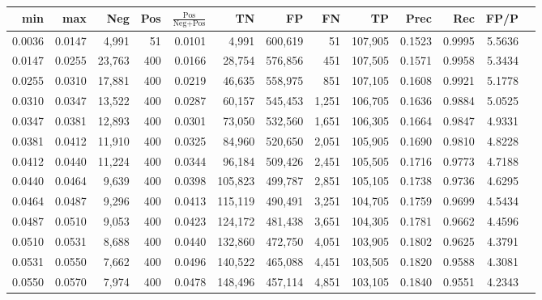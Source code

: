 \begin{tabular}{rrrrrrrrrrrrr}
\toprule
   min &    max &    Neg & Pos & $\frac{\text{Pos}}{\text{Neg}+\text{Pos}}$ &      TN &      FP &      FN &      TP &   Prec &    Rec &   FP/P \\
\midrule
0.0036 & 0.0147 &  4,991 &  51 &                                     0.0101 &   4,991 & 600,619 &      51 & 107,905 & 0.1523 & 0.9995 & 5.5636 \\
0.0147 & 0.0255 & 23,763 & 400 &                                     0.0166 &  28,754 & 576,856 &     451 & 107,505 & 0.1571 & 0.9958 & 5.3434 \\
0.0255 & 0.0310 & 17,881 & 400 &                                     0.0219 &  46,635 & 558,975 &     851 & 107,105 & 0.1608 & 0.9921 & 5.1778 \\
0.0310 & 0.0347 & 13,522 & 400 &                                     0.0287 &  60,157 & 545,453 &   1,251 & 106,705 & 0.1636 & 0.9884 & 5.0525 \\
0.0347 & 0.0381 & 12,893 & 400 &                                     0.0301 &  73,050 & 532,560 &   1,651 & 106,305 & 0.1664 & 0.9847 & 4.9331 \\
0.0381 & 0.0412 & 11,910 & 400 &                                     0.0325 &  84,960 & 520,650 &   2,051 & 105,905 & 0.1690 & 0.9810 & 4.8228 \\
0.0412 & 0.0440 & 11,224 & 400 &                                     0.0344 &  96,184 & 509,426 &   2,451 & 105,505 & 0.1716 & 0.9773 & 4.7188 \\
0.0440 & 0.0464 &  9,639 & 400 &                                     0.0398 & 105,823 & 499,787 &   2,851 & 105,105 & 0.1738 & 0.9736 & 4.6295 \\
0.0464 & 0.0487 &  9,296 & 400 &                                     0.0413 & 115,119 & 490,491 &   3,251 & 104,705 & 0.1759 & 0.9699 & 4.5434 \\
0.0487 & 0.0510 &  9,053 & 400 &                                     0.0423 & 124,172 & 481,438 &   3,651 & 104,305 & 0.1781 & 0.9662 & 4.4596 \\
0.0510 & 0.0531 &  8,688 & 400 &                                     0.0440 & 132,860 & 472,750 &   4,051 & 103,905 & 0.1802 & 0.9625 & 4.3791 \\
0.0531 & 0.0550 &  7,662 & 400 &                                     0.0496 & 140,522 & 465,088 &   4,451 & 103,505 & 0.1820 & 0.9588 & 4.3081 \\
0.0550 & 0.0570 &  7,974 & 400 &                                     0.0478 & 148,496 & 457,114 &   4,851 & 103,105 & 0.1840 & 0.9551 & 4.2343 \\

\end{tabular}
